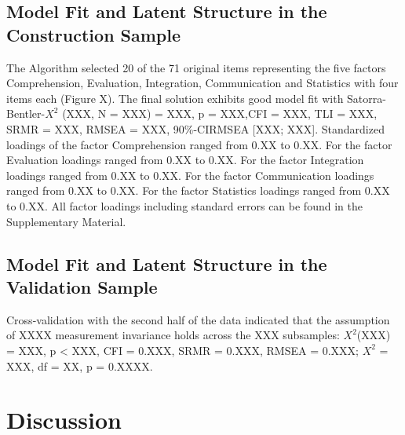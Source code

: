 \documentclass[
  12pt,
  a4paper,
  twoside]{article}
\begin{document}
\subsection{Model Fit and Latent Structure in the Construction Sample}\label{model-fit-and-latent-structure-in-the-construction-sample}

The Algorithm selected 20 of the 71 original items representing the five factors Comprehension, Evaluation, Integration, Communication and Statistics with four items each (Figure X). The final solution exhibits good model fit with Satorra-Bentler-\(X^{2}\) (XXX, N = XXX) = XXX, p = XXX,CFI = XXX, TLI = XXX, SRMR = XXX, RMSEA = XXX, 90\%-CIRMSEA {[}XXX; XXX{]}.
Standardized loadings of the factor Comprehension ranged from 0.XX to 0.XX. For the factor Evaluation loadings ranged from 0.XX to 0.XX. For the factor Integration loadings ranged from 0.XX to 0.XX. For the factor Communication loadings ranged from 0.XX to 0.XX. For the factor Statistics loadings ranged from 0.XX to 0.XX.
All factor loadings including standard errors can be found in the Supplementary Material.

\subsection{Model Fit and Latent Structure in the Validation Sample}\label{model-fit-and-latent-structure-in-the-validation-sample}

Cross-validation with the second half of the data indicated that the assumption of XXXX measurement invariance holds across the XXX subsamples: \(X^{2}\)(XXX) = XXX, p \textless{} XXX, CFI = 0.XXX, SRMR = 0.XXX, RMSEA = 0.XXX; \(X^{2}\) = XXX, df = XX, p = 0.XXXX.

\section{Discussion}\label{discussion}
\end{document}
